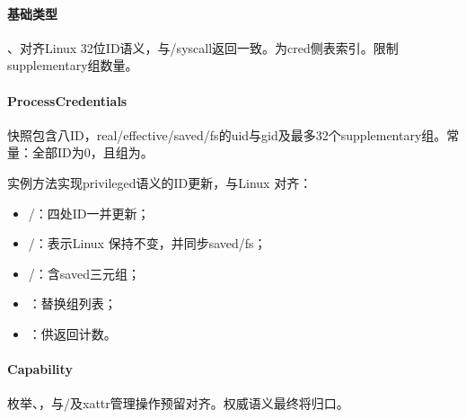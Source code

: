 
\paragraph{基础类型}

、对齐Linux 32位ID语义，与/syscall返回一致。为cred侧表索引。限制supplementary组数量。

\paragraph{ProcessCredentials}

快照包含八ID，real/effective/saved/fs的uid与gid及最多32个supplementary组。常量：全部ID为0，且组为\code{[0]}。

实例方法实现privileged语义的ID更新，与Linux  对齐：
\begin{itemize}
 \item {}/：四处ID一并更新；
 \item {}/：表示Linux 保持不变，并同步saved/fs；
 \item {}/：含saved三元组；
 \item {}：替换组列表；
 \item {}：供返回计数。
\end{itemize}

\paragraph{Capability}

枚举、，与/及xattr管理操作预留对齐。权威语义最终将归口。

